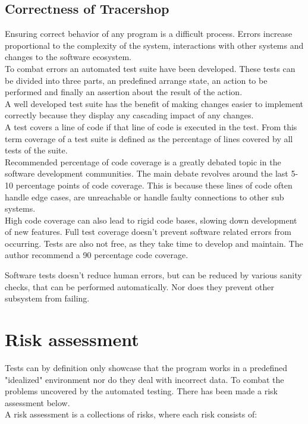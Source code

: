 \documentclass{article}
\begin{document}
\subsection*{Correctness of Tracershop}

Ensuring correct behavior of any program is a difficult process. Errors increase
proportional to the complexity of the system, interactions with other systems
and changes to the software ecosystem.\\
To combat errors an automated test suite have been developed. These tests can be
divided into three parts, an predefined arrange state, an action to be performed
and finally an assertion about the result of the action.\\
A well developed test suite has the benefit of making changes easier to
implement correctly because they display any cascading impact of any changes.\\
A test covers a line of code if that line of code is executed in the test. From
this term coverage of a test suite is defined as the percentage of lines covered
by all tests of the suite.\\
Recommended percentage of code coverage is a greatly debated topic in the
software development communities. The main debate revolves around the last 5-10
percentage points of code coverage. This is because these lines of code often
handle edge cases, are unreachable or handle faulty connections to other sub
systems.\\
High code coverage can also lead to rigid code bases, slowing down development
of new features. Full test coverage doesn't prevent software related errors from
occurring. Tests are also not free, as they take time to develop and maintain.
The author recommend a 90 percentage code coverage.

Software tests doesn't reduce human errors, but can be reduced by various sanity
checks, that can be performed automatically. Nor does they prevent other
subsystem from failing.

\section*{Risk assessment}

Tests can by definition only showcase that the program works in a predefined
"idealized" environment nor do they deal with incorrect data.
To combat the problems uncovered by the automated testing. There has been made a
risk assessment below.\\
A risk assessment is a collections of risks, where each risk consists of:
\end{document}
